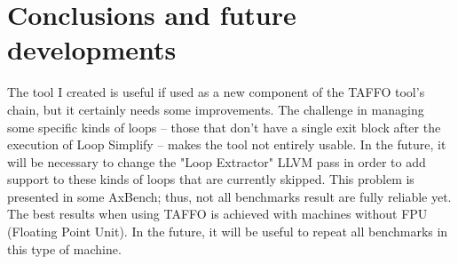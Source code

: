\section{Conclusions and future developments}

The tool I created is useful if used as a new component of the TAFFO tool's chain, but it certainly needs some improvements.
The challenge in managing some specific kinds of loops -- those that don't have a single exit block after the execution of Loop Simplify -- makes the tool not entirely usable.
In the future, it will be necessary to change the "Loop Extractor" LLVM pass in order to add support to these kinds of loops that are currently skipped.
This problem is presented in some AxBench; thus, not all benchmarks result are fully reliable yet.
The best results when using TAFFO is achieved with machines without FPU (Floating Point Unit). In the future, it will be useful to repeat all benchmarks in this type of machine.


